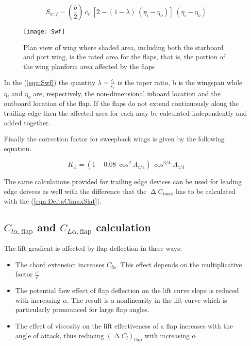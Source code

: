 \begin{equation}
S_{w,f}=\left(\dfrac{b}{2}\right)\ c_r\ \left[2-\left(1-\lambda\right)\ \left(\eta_i-\eta_o\right)\right]\ \left(\eta_i-\eta_o\right)
\label{eqn:Swf}
\end{equation}

\begin{figure}[!b]
  \centering
  \texttt{[image: Swf]}
  \caption{Plan view of wing where shaded area, including both the starboard and port wing, is the rated area for the flaps, that is, the portion of the wing planform area affected by the flaps}
  \label{fig:Swf}
\end{figure}

\noindent
In the (\ref{eqn:Swf}) the quantity $\lambda = \frac{c_t}{c_r}$ is the taper ratio, b is the wingspan while $\eta_i$ and $\eta_o$ are, respectively, the non-dimensional inboard location and the outboard location of the flap. If the flaps do not extend continuously along the trailing edge then the affected area for each may be calculated independently and added together.

\bigskip
\noindent
Finally the correction factor for sweepback wings is given by the following equation.

\begin{equation}
K_\Lambda=\left(1-0.08\ \cos^2\Lambda_{c/4}\right)\ \cos^{3/4}\Lambda_{c/4}
\label{eqn:KLambda}
\end{equation}

\noindent
The same calculations provided for trailing edge devices can be used for leading edge deivces as well with the difference that the $\upDelta C_{l\text{max}}$ has to be calculated with the (\ref{eqn:DeltaClmaxSlat}). 

\subsection{$C_{l\alpha, \text{flap}}$ and  $C_{L\alpha, \text{flap}}$ calculation}
The lift gradient is affected by flap deflection in three ways:

\begin{itemize}
\item The chord extension increases $C_{l\alpha}$. This effect depends on the multiplicative factor $\frac{c'}{c}$
\item The potential flow effect of flap deflection on the lift curve slope is reduced with increasing $\alpha$. The result is a nonlinearity in the lift curve which is particularly pronounced for large flap angles.
\item The effect of viscosity on the lift effectiveness of a flap increases with the angle of attack, thus reducing $\left(\upDelta C_{l}\right)_{\text{flap}}$ with increasing $\alpha$
\end{itemize}

